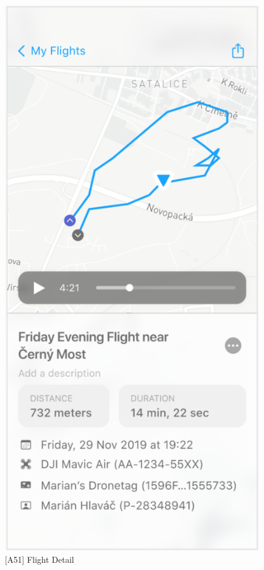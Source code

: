 \begin{figure}
\begin{minipage}{.45\textwidth}
        \includegraphics[width=.7\linewidth]{assets/user_interface_design/flight/flight_detail.png}
        \caption{[A51] Flight Detail}
        \label{fig:flight_detail}
    \end{minipage}
    \label{fig:flight_all}
\end{figure}

